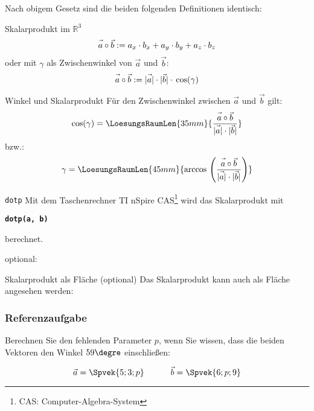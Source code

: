 Nach obigem Gesetz sind die beiden folgenden Definitionen identisch:
\begin{definition}{Skalarprodukt im $\mathbb{R}^3$}{}
  $$\vec{a\vphantom{b}}\circ\vec{b} := a_x\cdot{}b_x + a_y \cdot{} b_y + a_z\cdot{}b_z$$
oder mit $\gamma$ als Zwischenwinkel von $\vec{a}$ und $\vec{b}$:
  $$\vec{a\vphantom{b}}\circ\vec{b} := |\vec{\vphantom{b}a}| \cdot{} |\vec{b}| \cdot{}\cos({\gamma})$$
\end{definition}



\begin{gesetz}{Winkel und Skalarprodukt}{}
Für den Zwischenwinkel zwischen $\vec{a}$ und $\vec{b}$ gilt:
  $$\cos(\gamma) = \LoesungsRaumLen{35mm}{\frac{\vec{a\vphantom{b}}\circ\vec{b}}{|\vec{\vphantom{b}a}|\cdot |\vec{\vphantom{b}b}|}}$$
  bzw.:
  $$\gamma = \LoesungsRaumLen{45mm}{\arccos{} \left(\frac{\vec{a\vphantom{b}}\circ\vec{b}}{|\vec{\vphantom{b}a}|\cdot |\vec{\vphantom{b}b}|}\right)}$$
  
\end{gesetz}
\newpage
\begin{bemerkung}{\texttt{dotp}}{}
Mit dem Taschenrechner TI nSpire CAS\footnote{CAS: Computer-Algebra-System} wird das Skalarprodukt mit

\begin{center}\textbf\texttt{dotp(a, b)}\end{center}

berechnet.

\end{bemerkung}

optional:

\begin{bemerkung}{Skalarprodukt als Fläche (optional)}{}
  Das Skalarprodukt kann auch als Fläche angesehen werden:
  
\end{bemerkung}
\newpage


\subsubsection{Referenzaufgabe}
Berechnen Sie den fehlenden Parameter $p$, wenn Sie wissen, dass die
beiden Vektoren den Winkel $59\degre$ einschließen:

$$\vec{a} = \Spvek{5;3;p} \hspace{11mm} \vec{b} = \Spvek{6;p;9}$$

